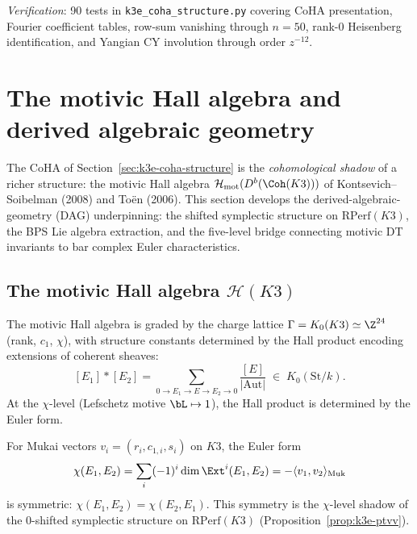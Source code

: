 \noindent\textit{Verification}: 90 tests in \texttt{k3e\_coha\_structure.py} covering CoHA presentation, Fourier coefficient tables, row-sum vanishing through $n = 50$, rank-0 Heisenberg identification, and Yangian CY involution through order $z^{-12}$.



\section{The motivic Hall algebra and derived algebraic geometry}
\label{sec:k3e-motivic-hall-dag}

The CoHA of Section~\ref{sec:k3e-coha-structure} is the \emph{cohomological shadow} of a richer structure: the motivic Hall algebra $\mathcal{H}_{\mathrm{mot}}(D^b(\Coh(K3)))$ of Kontsevich--Soibelman (2008) and To\"en (2006).  This section develops the derived-algebraic-geometry (DAG) underpinning: the shifted symplectic structure on $\mathrm{RPerf}(K3)$, the BPS Lie algebra extraction, and the five-level bridge connecting motivic DT invariants to bar complex Euler characteristics.

\subsection{The motivic Hall algebra $\mathcal{H}(K3)$}
\label{subsec:k3e-hall-algebra}

The motivic Hall algebra is graded by the charge lattice $\Gamma = K_0(K3) \simeq \Z^{24}$ (rank, $c_1$, $\chi$), with structure constants determined by the Hall product encoding extensions of coherent sheaves:
\[
  [E_1] * [E_2]
  = \sum_{0 \to E_1 \to E \to E_2 \to 0} \frac{[E]}{|\mathrm{Aut}|}
  \;\in\; K_0(\mathrm{St}/k).
\]
At the $\chi$-level (Lefschetz motive $\bL \mapsto 1$), the Hall product is determined by the Euler form.

\begin{proposition}
\label{prop:k3e-euler-form}
\ClaimStatusProvedElsewhere
For Mukai vectors $v_i = (r_i, c_{1,i}, s_i)$ on $K3$, the Euler form
\[
  \chi(E_1, E_2)
  = \sum_i (-1)^i \dim \Ext^i(E_1, E_2)
  = -\langle v_1, v_2 \rangle_{\mathrm{Muk}}
\]
is symmetric: $\chi(E_1, E_2) = \chi(E_2, E_1)$.  This symmetry is the $\chi$-level shadow of the $0$-shifted symplectic structure on $\mathrm{RPerf}(K3)$ (Proposition~\ref{prop:k3e-ptvv}).
\end{proposition}

